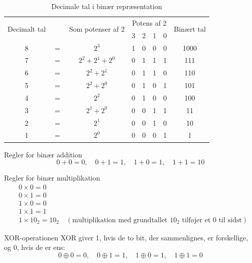 \begin{table}[!ht]
\centering
\renewcommand{\arraystretch}{1.4}
\begin{tabular}{|c c c c c c c c|}
\hline 
\multirow{2}{*}{Decimalt tal} & & \multirow{2}{*}{Som potenser af 2} & \multicolumn{4}{c}{Potens af 2} & \multirow{2}{*}{Binært tal} \\
& & & 3 & 2 & 1 & 0 & \\ \hline
8 & $=$ & $2^3$ & 1 & 0 & 0 & 0 & 1000 \\
7 & $=$ & $2^2 + 2^1 + 2^0$ & 0 & 1 & 1 & 1 & 111 \\
6 & $=$ & $2^2 + 2^1$ & 0 & 1 & 1 & 0 & 110 \\
5 & $=$ & $2^2 + 2^0$ & 0 & 1 & 0 & 1 & 101 \\
4 & $=$ & $2^2$ & 0 & 1 & 0 & 0 & 100 \\
3 & $=$ & $2^1 + 2^0$ & 0 & 0 & 1 & 1 & 11 \\
2 & $=$ & $2^1$ & 0 & 0 & 1 & 0 & 10 \\
1 & $=$ & $2^0$ & 0 & 0 & 0 & 1 & 1 \\ \hline
\end{tabular}
\caption{Decimale tal i binær repræsentation}
\end{table}

\begin{proposition}{Regler for binær addition}
\[
0 + 0 = 0, \quad 0 + 1 = 1, \quad 1 + 0 = 1, \quad 1 + 1 = 10
\]
\end{proposition}

\begin{proposition}{Regler for binær multiplikation}
\[
\begin{aligned}
& 0 \times 0=0 \\
& 0 \times 1=0 \\
& 1 \times 0=0 \\
& 1 \times 1=1 \\
& 1 \times 10_2 = 10_2 \quad \left( \text{multiplikation med grundtallet } 10_2 \text{ tilføjer et 0 til sidst} \right)
\end{aligned}
\]
\end{proposition}

\begin{proposition}{XOR-operationen}
XOR giver 1, hvis de to bit, der sammenlignes, er forskellige, og 0, hvis de er ens:
\[
0 \oplus 0 = 0, \quad 0 \oplus 1 = 1, \quad 1 \oplus 0 = 1, \quad 1 \oplus 1 = 0
\]
\end{proposition}

